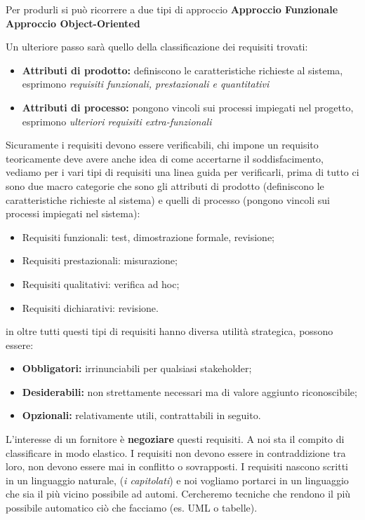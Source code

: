 Per produrli si può  ricorrere a due tipi di approccio \textbf{Approccio Funzionale} \textbf{Approccio Object-Oriented}

Un ulteriore passo sarà quello della classificazione dei requisiti trovati:
\begin{itemize}
	\item \textbf{Attributi di prodotto:} definiscono le caratteristiche richieste al sistema, esprimono \textit{requisiti funzionali, prestazionali e quantitativi} 
	\item \textbf{Attributi di processo:} pongono vincoli sui processi impiegati nel progetto, esprimono \textit{ulteriori requisiti extra-funzionali}
\end{itemize}


Sicuramente i requisiti devono essere verificabili, chi impone un requisito teoricamente deve avere anche idea di come accertarne il soddisfacimento, vediamo per i vari tipi di requisiti una linea guida per verificarli, prima di tutto ci sono due macro categorie che sono gli attributi di prodotto (definiscono le caratteristiche richieste al sistema) e quelli di processo (pongono vincoli sui processi impiegati nel sistema):

\begin{itemize}
	\item Requisiti funzionali: test, dimostrazione formale, revisione;
	\item Requisiti prestazionali: misurazione;
	\item Requisiti qualitativi: verifica ad hoc;
	\item Requisiti dichiarativi: revisione.
\end{itemize}
in oltre tutti questi tipi di requisiti hanno diversa utilità strategica, possono essere:
\begin{itemize}
	\item \textbf{Obbligatori:} irrinunciabili per qualsiasi stakeholder;
	\item \textbf{Desiderabili:} non strettamente necessari ma di valore aggiunto riconoscibile;
	\item \textbf{Opzionali:} relativamente utili, contrattabili in seguito.
\end{itemize}

L'interesse di un fornitore è \textbf{negoziare} questi requisiti. A noi sta il compito di classificare in modo elastico. I requisiti non devono essere in contraddizione tra loro, non devono essere mai in conflitto o sovrapposti. I requisiti nascono scritti in un linguaggio naturale, (\textit{i capitolati}) e noi vogliamo portarci in un linguaggio che sia il più vicino possibile ad automi. Cercheremo tecniche che rendono il più possibile automatico ciò che facciamo (es. UML o tabelle).\\

